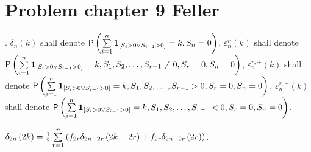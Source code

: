 \section{Problem chapter 9 Feller}
\begin{defn}[$\delta, \varepsilon$]
  \Lrws. $\delta_{n}\left( k\right)$ shall denote $\pr\left(\suma \indikator{S_i>0 \lor S_{i-1}>0}=k, S_n=0 \right)$,
  $  \varepsilon_{n}^r\left(k \right)$ shall denote $\pr\left(\suma \indikator{S_i>0 \lor S_{i-1}>0}=k, S_1, S_2, \ldots, S_{r-1}\neq 0, S_r=0, S_n=0 \right)$,
  $\varepsilon_{n}^{r,+}\left(k \right)$ shall denote $\pr\left(\suma \indikator{S_i>0 \lor S_{i-1}>0}=k, S_1, S_2, \ldots, S_{r-1} > 0, S_r=0, S_n=0 \right)$,
  $\varepsilon_{n}^{r,-}\left(k \right)$ shall denote $\pr\left(\suma \indikator{S_i>0 \lor S_{i-1}>0}=k, S_1, S_2, \ldots, S_{r-1} < 0, S_r=0, S_n=0 \right)$.
\end{defn}
\begin{lemma}\label{thm-factorization_lemma}
  $\delta_{2n}\left( 2k\right)
  =\h \suma[r][1][n]\left( f_{2r} \delta_{2n-2r}\left(2k-2r\right)+f_{2r} \delta_{2n-2r}\left( 2r \right)\right)$.
\end{lemma}
